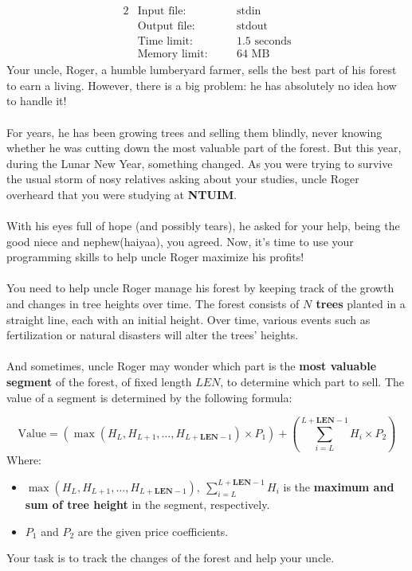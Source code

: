 \documentclass[12pt,a4paper]{article}
\begin{document}
\begin{alignat*} {2}
 &   \text{Input file:}   \quad     &&\text{stdin}\\
 &   \text{Output file:}  \quad     &&\text{stdout}\\
 &   \text{Time limit:}   \quad     &&\text{1.5 seconds}\\
 &   \text{Memory limit:} \quad     &&\text{64 MB}
\end{alignat*}
\noindent
Your uncle, Roger, a humble lumberyard farmer, sells the best part of his forest to earn a living. However, there is a big problem: he has absolutely no idea how to handle it! 
\\\\
\noindent
For years, he has been growing trees and selling them blindly, never knowing whether he was cutting down the most valuable part of the forest. But this year, during the Lunar New Year, something changed. As you were trying to survive the usual storm of nosy relatives asking about your studies, uncle Roger overheard that you were studying at \textbf{NTUIM}.  
\\\\
\noindent
With his eyes full of hope (and possibly tears), he asked for your help, being the good niece and nephew(haiyaa), you agreed. Now, it's time to use your programming skills to help uncle Roger maximize his profits!
\\\\
\noindent
You need to help uncle Roger manage his forest by keeping track of the growth and changes in tree heights over time. The forest consists of \textbf{\(N\) trees} planted in a straight line, each with an initial height. Over time, various events such as fertilization or natural disasters will alter the trees' heights.
\\\\
\noindent
And sometimes, uncle Roger may wonder which part is the \textbf{most valuable segment} of the forest, of fixed length \textbf{\(LEN\)}, to determine which part to sell. The value of a segment is determined by the following formula:

\[
\text{Value} = (\max(H_L, H_{L+1}, \dots, H_{L+\textbf{LEN}-1}) \times P_1) + (\sum_{i=L}^{L+\textbf{LEN}-1} H_i \times P_2)
\]
\noindent
Where:
\begin{itemize}
    \item \( \max(H_L, H_{L+1}, \dots, H_{L+\textbf{LEN}-1}),\ \sum_{i=L}^{L+\textbf{LEN}-1} H_i \) is the \textbf{maximum and sum of tree height} in the segment, respectively.
    \item \( P_1 \) and \( P_2 \) are the given price coefficients.
\end{itemize}
\noindent
Your task is to track the changes of the forest and help your uncle.
\end{document}
